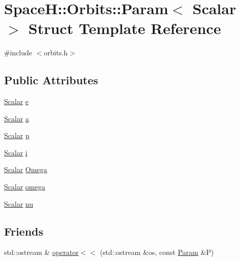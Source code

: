\hypertarget{struct_space_h_1_1_orbits_1_1_param}{}\section{SpaceH\+:\+:Orbits\+:\+:Param$<$ Scalar $>$ Struct Template Reference}
\label{struct_space_h_1_1_orbits_1_1_param}


{\ttfamily \#include $<$orbits.\+h$>$}

\subsection*{Public Attributes}
\begin{DoxyCompactItemize}
\item 
\mbox{\hyperlink{create_kepler_8cpp_a8c2981f3f834be9448a6ab06c28748eb}{Scalar}} \mbox{\hyperlink{struct_space_h_1_1_orbits_1_1_param_a556bdfa7c970d194ae30475e9fc01057}{e}}
\item 
\mbox{\hyperlink{create_kepler_8cpp_a8c2981f3f834be9448a6ab06c28748eb}{Scalar}} \mbox{\hyperlink{struct_space_h_1_1_orbits_1_1_param_a9547603de19a4532bef2c12cc27b9e59}{a}}
\item 
\mbox{\hyperlink{create_kepler_8cpp_a8c2981f3f834be9448a6ab06c28748eb}{Scalar}} \mbox{\hyperlink{struct_space_h_1_1_orbits_1_1_param_ae5cfa9345566dfdb9b7f1572a504c871}{p}}
\item 
\mbox{\hyperlink{create_kepler_8cpp_a8c2981f3f834be9448a6ab06c28748eb}{Scalar}} \mbox{\hyperlink{struct_space_h_1_1_orbits_1_1_param_a2a1eb55dcbb0f9a6331dd07cda5d74f0}{i}}
\item 
\mbox{\hyperlink{create_kepler_8cpp_a8c2981f3f834be9448a6ab06c28748eb}{Scalar}} \mbox{\hyperlink{struct_space_h_1_1_orbits_1_1_param_a3b8865c1d8219e642123738e90a3d649}{Omega}}
\item 
\mbox{\hyperlink{create_kepler_8cpp_a8c2981f3f834be9448a6ab06c28748eb}{Scalar}} \mbox{\hyperlink{struct_space_h_1_1_orbits_1_1_param_a68b12502aac994cdac86ccb4f4d5958d}{omega}}
\item 
\mbox{\hyperlink{create_kepler_8cpp_a8c2981f3f834be9448a6ab06c28748eb}{Scalar}} \mbox{\hyperlink{struct_space_h_1_1_orbits_1_1_param_a237d50c5a67df7c4ccf25929da750341}{nu}}
\end{DoxyCompactItemize}
\subsection*{Friends}
\begin{DoxyCompactItemize}
\item 
std\+::ostream \& \mbox{\hyperlink{struct_space_h_1_1_orbits_1_1_param_a75c015aaf43c749ef7a0a3b396dee912}{operator$<$$<$}} (std\+::ostream \&os, const \mbox{\hyperlink{struct_space_h_1_1_orbits_1_1_param}{Param}} \&P)
\end{DoxyCompactItemize}


